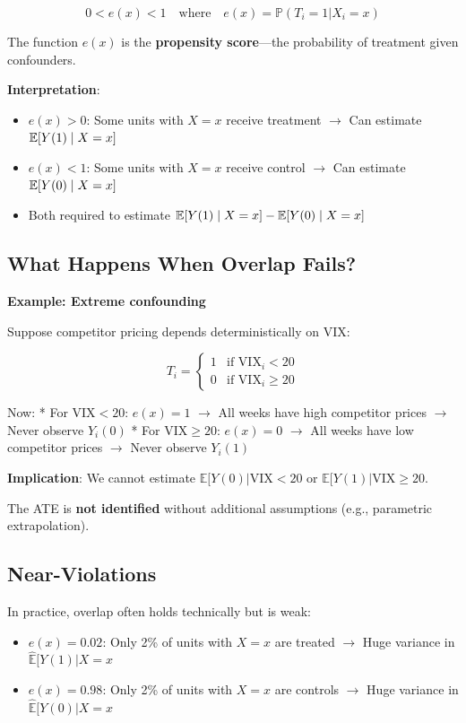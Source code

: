 \[0 < e(x) < 1 \quad \text{where} \quad e(x) = \mathbb{P}(T_i = 1 | X_i = x)\]

The function \(e(x)\) is the \textbf{propensity score}---the probability
of treatment given confounders.

\textbf{Interpretation}:
\begin{itemize}
\item $e(x) > 0$: Some units with $X = x$ receive treatment $\to$ Can estimate $\mathbb{E}[Y(1) \mid X = x]$
\item $e(x) < 1$: Some units with $X = x$ receive control $\to$ Can estimate $\mathbb{E}[Y(0) \mid X = x]$
\item Both required to estimate $\mathbb{E}[Y(1) \mid X = x] - \mathbb{E}[Y(0) \mid X = x]$
\end{itemize}

\subsection{What Happens When Overlap
Fails?}\label{_what_happens_when_overlap_fails}

\textbf{Example: Extreme confounding}

Suppose competitor pricing depends deterministically on VIX:

\[T_i = \begin{cases}
1 & \text{if VIX}_i < 20 \\
0 & \text{if VIX}_i \geq 20
\end{cases}\]

Now: * For \(\text{VIX} < 20\): \(e(x) = 1\) $\to$ All weeks have high
competitor prices $\to$ Never observe \(Y_i(0)\) * For
\(\text{VIX} \geq 20\): \(e(x) = 0\) $\to$ All weeks have low competitor
prices $\to$ Never observe \(Y_i(1)\)

\textbf{Implication}: We cannot estimate
\(\mathbb{E}[Y(0) | \text{VIX} < 20\) or
\(\mathbb{E}[Y(1) | \text{VIX} \geq 20\).

The ATE is \textbf{not identified} without additional assumptions (e.g.,
parametric extrapolation).

\subsection{Near-Violations}\label{_near_violations}

In practice, overlap often holds technically but is weak:

\begin{itemize}
\item
  \(e(x) = 0.02\): Only 2\% of units with \(X = x\) are treated $\to$ Huge
  variance in \(\hat{\mathbb{E}}[Y(1) | X = x\)
\item
  \(e(x) = 0.98\): Only 2\% of units with \(X = x\) are controls $\to$ Huge
  variance in \(\hat{\mathbb{E}}[Y(0) | X = x\)
\end{itemize}

